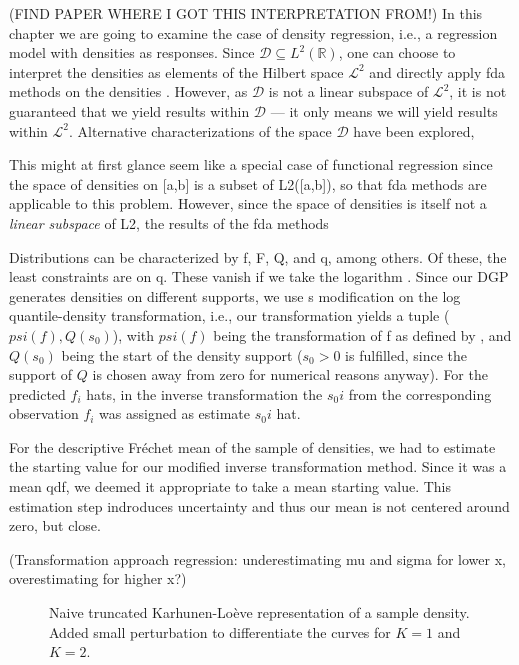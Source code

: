 (FIND PAPER WHERE I GOT THIS INTERPRETATION FROM!)
In this chapter we are going to examine the case of density regression, i.e., a
regression model with densities as responses. Since $\mathcal{D} \subseteq L^2(\mathbb{R})$,
one can choose to interpret the densities as elements of
the Hilbert space $\mathcal{L}^2$ and directly apply fda methods on the densities
\parencite[see e.g.][]{KneipUtikal2001}. However,
as $\mathcal{D}$ is not a linear subspace of $\mathcal{L}^2$, it is not guaranteed that
we yield results within $\mathcal{D}$ --- it only means we will yield results within $\mathcal{L}^2$.
Alternative characterizations of the space $\mathcal{D}$ have been explored,

This might at first glance seem like a
special case of functional regression since the space of densities on [a,b] is a subset
of L2([a,b]), so that fda methods are applicable to this problem. However, since the
space of densities is itself not a \textit{linear subspace} of L2, the results of the
fda methods

Distributions can be characterized by f, F, Q, and q, among others. Of these, the least
constraints are on q. These vanish if we
take the logarithm \parencite[cf.][]{KokoszkaEtAl2019}. Since our DGP generates densities on
different supports, we use \textcite{KokoszkaEtAl2019}s modification on the log quantile-density
transformation, i.e., our transformation yields a tuple ($psi(f), Q(s_0)$), with
$psi(f)$ being the transformation of f as defined by \textcite{PetersenMüller2016}, and
$Q(s_0)$ being the start of the density support ($s_0 > 0$ is fulfilled, since the support
of $Q$ is chosen away from zero for numerical reasons anyway). For the predicted $f_i$ hats,
in the inverse transformation the $s_0i$ from the corresponding observation $f_i$ was
assigned as estimate $s_0i$ hat.

For the descriptive Fréchet mean of the sample of densities, we had to estimate the
starting value for our modified inverse transformation method. Since it was a mean qdf,
we deemed it appropriate to take a mean starting value. This estimation step indroduces
uncertainty and thus our mean is not centered around zero, but close.

(Transformation approach regression: underestimating mu and sigma for lower x,
overestimating for higher x?) \textcite{PetersenLiuDivani2021}

\begin{figure}[h]
    \centering
    \resizebox{0.9\textwidth}{!}{}
    \caption[Truncated representation --- naive]{Naive truncated Karhunen-Loève
    representation of a sample density. Added
    small perturbation to differentiate the curves for $K=1$ and $K=2$.}
    \label{fig:naive_trunc_rep}
\end{figure}

